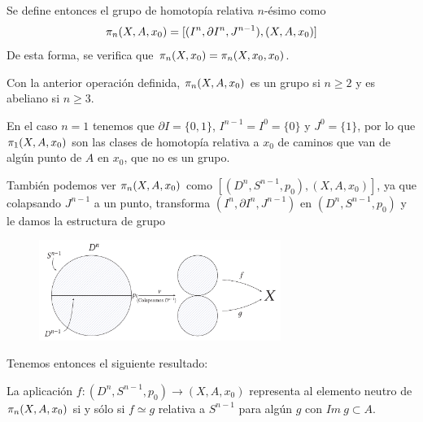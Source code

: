 Se define entonces el grupo de homotopía relativa $n$-ésimo como
\[
\pi_{n}(X, A, x_0) = [(I^n, \partial I^n, J^{n-1}), (X, A, x_0)]
\]
De esta forma, se verifica que $\pi_{n}(X, x_0) = \pi_{n}(X, x_0, x_0)$. \par
Con la anterior operación definida, $\pi_{n}(X, A, x_0)$ es un grupo si $n \geq 2$ y es abeliano si $n \geq 3$. \par
En el caso $n =1$ tenemos que $\partial I = \{0,1\}$, $I^{n-1} = I^0 = \{0\}$ y $J^0 = \{1\}$, por lo que $\pi_{1}(X, A, x_0)$ son las clases de homotopía relativa a $x_0$ de caminos que van de algún punto de $A$ en $x_0$, que no es un grupo. \par
También podemos ver $\pi_{n}(X, A, x_0)$ como $[(D^n, S^{n-1}, p_0), (X, A, x_0)]$, ya que colapsando $J^{n-1}$ a un punto, transforma $(I^n, \partial I^n, J^{n-1})$ en $(D^n, S^{n-1}, p_0)$ y le damos la estructura de grupo \par
\begin{figure}[h]
\centering
\includegraphics[width = 0.7\textwidth]{images/opergrupohomotrel}
\end{figure}
Tenemos entonces el siguiente resultado:
\begin{teor}
La aplicación $ f : (D^n, S^{n-1}, p_0) \longrightarrow (X, A, x_0)$ representa al elemento neutro de $\pi_{n}(X, A, x_0)$ si y sólo si $f \simeq g$ relativa a $S^{n-1}$ para algún $g$ con $Im\ g \subset A$.
\end{teor}
